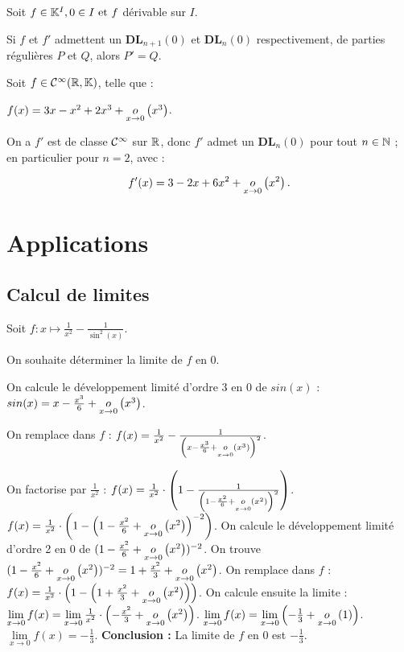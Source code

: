 \documentclass[12pt, a4paper]{report}
\begin{document}
\begin{property}
    Soit $f \in \mathbb{K}^I, 0 \in I \text{ et } f$ dérivable sur $I$.

    Si $f$ et $f'$ admettent un $\mathbf{DL}_{n+1}(0)$ et $\mathbf{DL}_n(0)$ respectivement, de parties régulières $P$ et $Q$, alors $P'=Q$.
\end{property}

\begin{example}
    Soit $f\in\mathcal{C}^\infty(\mathbb{R},\mathbb{K})$, telle que :
    
    $f(x)=3x-x^2+2x^3+\underset{x\to0}{o}\left(x^3\right)$.

    On a $f'$ est de classe $\mathcal{C}^{\infty}$ sur $\mathbb{R}$, donc $f'$ admet un $\mathbf{DL}_n(0)$ pour tout $n\in\mathbb{N}$ ; en particulier pour $n=2$, avec :

    $$f'(x) = 3 - 2x + 6x^2 + \underset{x\to0}{o}\left(x^2\right).$$
\end{example}

\chapter{Applications}

\section{Calcul de limites}

\begin{example}
    Soit $f:x\mapsto \frac{1}{x^2} - \frac{1}{\sin^2(x)}$.

    On souhaite déterminer la limite de $f$ en $0$.

    \begin{outline}
        \1 On calcule le développement limité d'ordre 3 en 0 de $sin(x)$ : $sin(x) = x - \frac{x^3}{6} + \underset{x\to0}{o}\left(x^3\right)$.

        \1 On remplace dans $f$ :
        \2 $f(x) = \frac{1}{x^2} - \frac{1}{\left(x - \frac{x^3}{6} + \underset{x\to0}{o}\left(x^3\right)\right)^2}$.

        \1 On factorise par $\frac{1}{x^2}$ :
        \2 $f(x) = \frac{1}{x^2} \cdot \left(1 - \frac{1}{\left(1 - \frac{x^2}{6} + \underset{x\to0}{o}\left(x^2\right)\right)^2}\right)$.
        \2 $f(x) = \frac{1}{x^2} \cdot \left(1 - \left(1 - \frac{x^2}{6} + \underset{x\to0}{o}\left(x^2\right)\right)^{-2}\right)$.
        \1 On calcule le développement limité d'ordre 2 en 0 de $(1 - \frac{x^2}{6} + \underset{x\to0}{o}\left(x^2\right))^{-2}$.
        \2 On trouve $(1 - \frac{x^2}{6} + \underset{x\to0}{o}\left(x^2\right))^{-2} = 1 + \frac{x^2}{3} + \underset{x\to0}{o}\left(x^2\right)$.
        \1 On remplace dans $f$ :
        \2 $f(x) = \frac{1}{x^2} \cdot \left(1 - \left(1 + \frac{x^2}{3} + \underset{x\to0}{o}\left(x^2\right)\right)\right)$.
        \1 On calcule ensuite la limite :
        \2 $\lim\limits_{x\to 0} f(x) = \lim\limits_{x\to 0} \frac{1}{x^2} \cdot \left(-\frac{x^2}{3} + \underset{x\to0}{o}\left(x^2\right)\right)$.
        \2 $\lim\limits_{x\to 0} f(x) = \lim\limits_{x\to 0} \left(-\frac{1}{3} + \underset{x\to0}{o}\left(1\right)\right)$.
        \2 $\lim\limits_{x\to 0} f(x) = -\frac{1}{3}$.
        \1 \textbf{Conclusion :} La limite de $f$ en $0$ est $-\frac{1}{3}$.
    \end{outline}
\end{example}
\end{document}
